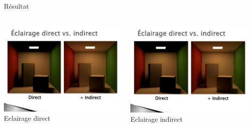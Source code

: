 \begin{frame}{Résultat}
    \begin{columns}
        \begin{column}{0.49\textwidth}
            \begin{center}
                \includegraphics[width=\columnwidth]{figs/rendu-direct.pdf}
                Eclairage direct 
            \end{center}
        \end{column}
        \begin{column}{0.49\textwidth}
            \begin{center}
                \includegraphics[width=\columnwidth]{figs/rendu-indirect.pdf}
                Eclairage indirect 
            \end{center}
        \end{column}
    \end{columns}
\end{frame}

